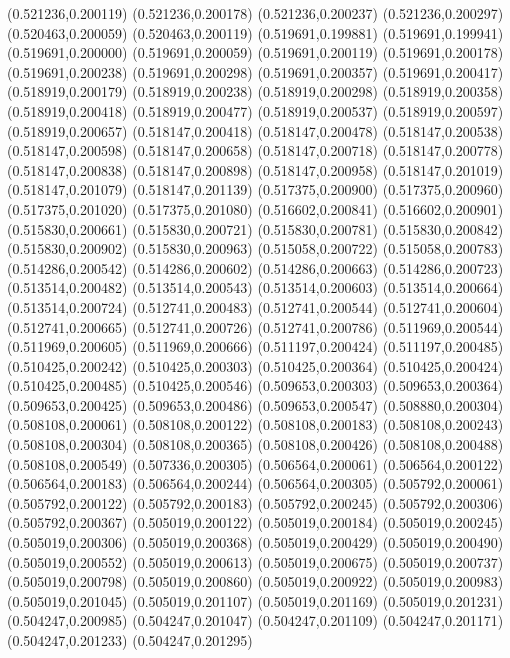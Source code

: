 (0.521236,0.200119)
(0.521236,0.200178)
(0.521236,0.200237)
(0.521236,0.200297)
(0.520463,0.200059)
(0.520463,0.200119)
(0.519691,0.199881)
(0.519691,0.199941)
(0.519691,0.200000)
(0.519691,0.200059)
(0.519691,0.200119)
(0.519691,0.200178)
(0.519691,0.200238)
(0.519691,0.200298)
(0.519691,0.200357)
(0.519691,0.200417)
(0.518919,0.200179)
(0.518919,0.200238)
(0.518919,0.200298)
(0.518919,0.200358)
(0.518919,0.200418)
(0.518919,0.200477)
(0.518919,0.200537)
(0.518919,0.200597)
(0.518919,0.200657)
(0.518147,0.200418)
(0.518147,0.200478)
(0.518147,0.200538)
(0.518147,0.200598)
(0.518147,0.200658)
(0.518147,0.200718)
(0.518147,0.200778)
(0.518147,0.200838)
(0.518147,0.200898)
(0.518147,0.200958)
(0.518147,0.201019)
(0.518147,0.201079)
(0.518147,0.201139)
(0.517375,0.200900)
(0.517375,0.200960)
(0.517375,0.201020)
(0.517375,0.201080)
(0.516602,0.200841)
(0.516602,0.200901)
(0.515830,0.200661)
(0.515830,0.200721)
(0.515830,0.200781)
(0.515830,0.200842)
(0.515830,0.200902)
(0.515830,0.200963)
(0.515058,0.200722)
(0.515058,0.200783)
(0.514286,0.200542)
(0.514286,0.200602)
(0.514286,0.200663)
(0.514286,0.200723)
(0.513514,0.200482)
(0.513514,0.200543)
(0.513514,0.200603)
(0.513514,0.200664)
(0.513514,0.200724)
(0.512741,0.200483)
(0.512741,0.200544)
(0.512741,0.200604)
(0.512741,0.200665)
(0.512741,0.200726)
(0.512741,0.200786)
(0.511969,0.200544)
(0.511969,0.200605)
(0.511969,0.200666)
(0.511197,0.200424)
(0.511197,0.200485)
(0.510425,0.200242)
(0.510425,0.200303)
(0.510425,0.200364)
(0.510425,0.200424)
(0.510425,0.200485)
(0.510425,0.200546)
(0.509653,0.200303)
(0.509653,0.200364)
(0.509653,0.200425)
(0.509653,0.200486)
(0.509653,0.200547)
(0.508880,0.200304)
(0.508108,0.200061)
(0.508108,0.200122)
(0.508108,0.200183)
(0.508108,0.200243)
(0.508108,0.200304)
(0.508108,0.200365)
(0.508108,0.200426)
(0.508108,0.200488)
(0.508108,0.200549)
(0.507336,0.200305)
(0.506564,0.200061)
(0.506564,0.200122)
(0.506564,0.200183)
(0.506564,0.200244)
(0.506564,0.200305)
(0.505792,0.200061)
(0.505792,0.200122)
(0.505792,0.200183)
(0.505792,0.200245)
(0.505792,0.200306)
(0.505792,0.200367)
(0.505019,0.200122)
(0.505019,0.200184)
(0.505019,0.200245)
(0.505019,0.200306)
(0.505019,0.200368)
(0.505019,0.200429)
(0.505019,0.200490)
(0.505019,0.200552)
(0.505019,0.200613)
(0.505019,0.200675)
(0.505019,0.200737)
(0.505019,0.200798)
(0.505019,0.200860)
(0.505019,0.200922)
(0.505019,0.200983)
(0.505019,0.201045)
(0.505019,0.201107)
(0.505019,0.201169)
(0.505019,0.201231)
(0.504247,0.200985)
(0.504247,0.201047)
(0.504247,0.201109)
(0.504247,0.201171)
(0.504247,0.201233)
(0.504247,0.201295)

